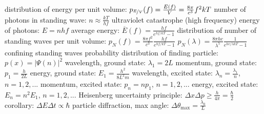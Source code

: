 \documentclass[10pt,landscape]{article}
\newcommand{\spc}{\hspace*{1em}}
\begin{document}
\begin{multicols*}{3}
\newline
\spc distribution of energy per unit volume:
\newline
\spc \spc $p_{\nicefrac{E}{V}}(f)=\frac{E(f)}{V}=\frac{8\pi}{c^3}f^2kT$
\newline
\spc number of photons in standing wave: $n\approx \frac{kT}{hf}$
\newpage
ultraviolet catastrophe (high frequency)
\newline
\spc energy of photons: $E=nhf$
\newline
\spc average energy: $\overline{E}(f)=\frac{hf}{e^{hf/kT}-1}$
\newline
\spc distribution of number of standing waves per unit volume:
\newline
\spc \spc $p_N(f)=\frac{8\pi f^2}{c^3}\frac {hf}{e^{hf/kT}-1}$
\newline
\spc \spc $p_N(\lambda)=\frac{8\pi hc}{\lambda^5}\frac{1}{e^{hc/\lambda kT}-1}$
\newline \newline
confining standing waves
\newline
\spc probability distribution of finding particle: $p(x)=|\Psi(n)|^2$
\newline
\spc wavelength, ground state: $\lambda_1=2L$
\newline
\spc momentum, ground state: $p_1=\frac{h}{2L}$
\newline
\spc energy, ground state: $E_1=\frac{h^2}{8L^2m}$
\newline
\spc wavelength, excited state: $\lambda_n=\frac{\lambda_1}{n}$, $n=1,2,...$
\newline
\spc momentum, excited state: $p_n=np_1$, $n=1,2,...$
\newline
\spc energy, excited state: $E_n=n^2E_1$, $n=1,2,...$
\newline \newline
Heisenberg uncertainty principle: $\Delta x\Delta p\geq \frac{h}{4\pi}= \frac{\hbar}{2}$
\newline
\spc corollary: $\Delta E\Delta t\propto \hbar$
\newline
particle diffraction, max angle: $\Delta \theta_{\textrm{max}}=\frac{\lambda_0}{L}$

\end{multicols*}
\end{document}
